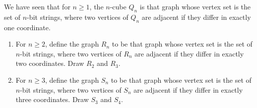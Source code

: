 \begin{exer}
We have seen that for $n \geq 1$, the $n$-cube $Q_{n}$ is that graph whose vertex set is the set of $n$-bit strings, where two vertices of $Q_{n}$ are adjacent if they differ in exactly one coordinate.
\begin{enumerate}[{(a)}]
\item For $n \geq 2$, define the graph $R_{n}$ to be that graph whose vertex set is the set of $n$-bit strings, where two vertices of $R_{n}$ are adjacent if they differ in exactly two coordinates. Draw $R_{2}$ and $R_{3}$.
\item For $n \geq 3$, define the graph $S_{n}$ to be that graph whose vertex set is the set of $n$-bit strings, where two vertices of $S_{n}$ are adjacent if they differ in exactly three coordinates. Draw $S_{3}$ and $S_{4}$.
\end{enumerate}
\end{exer}